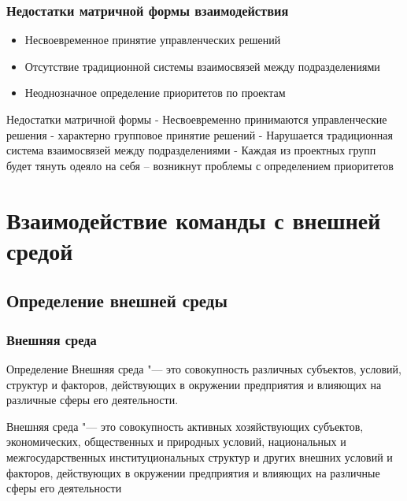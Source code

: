 \documentclass{../industrial-development}
\begin{document}
\begin{frame} \frametitle{Недостатки матричной формы взаимодействия}
\begin{itemize}
  \item Несвоевременное принятие управленческих решений
  \item Отсутствие традиционной системы взаимосвязей между подразделениями
  \item Неоднозначное определение приоритетов по проектам
  \end{itemize}
\end{frame}

\lecturenotes
Недостатки матричной формы
- Несвоевременно принимаются управленческие решения - характерно групповое принятие решений
- Нарушается традиционная система взаимосвязей между подразделениями
- Каждая из проектных групп будет тянуть одеяло на себя – возникнут проблемы  с определением приоритетов

\section{Взаимодействие команды с внешней средой}

\subsection{Определение внешней среды}
\begin{frame} \frametitle{Внешняя среда}
	\begin{block}{Определение}
		\alert{Внешняя среда} "--- это совокупность различных субъектов, условий, структур и факторов, действующих в окружении предприятия и влияющих на различные сферы его деятельности.
	\end{block}
\end{frame}

\lecturenotes Внешняя среда "--- это совокупность активных хозяйствующих субъектов, экономических, общественных и природных условий, национальных и межгосударственных институциональных структур и других внешних условий и факторов, действующих в окружении предприятия и влияющих на различные сферы его деятельности
\end{document}

